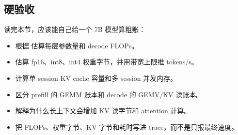 \subsection{硬验收}

读完本节，应该能自己给一个 7B 模型算粗账：

\begin{itemize}
  \item 根据  估算每层参数量和 decode FLOPs。
  \item 估算 fp16、int8、int4 权重字节，并用带宽上限推 tokens/s。
  \item 计算单 session KV cache 容量和多 session 并发内存。
  \item 区分 prefill 的 GEMM 账本和 decode 的 GEMV/KV 读账本。
  \item 解释为什么长上下文会增加 KV 读字节和 attention 计算。
  \item 把 FLOPs、权重字节、KV 字节和耗时写进 trace，而不是只报最终速度。
\end{itemize}
